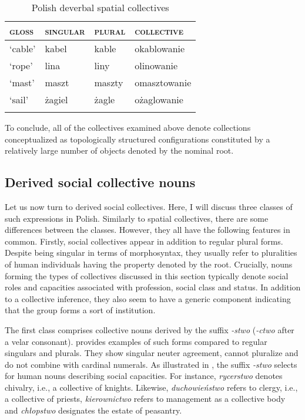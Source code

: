 \documentclass[output=paper]{langscibook}
\begin{document}
\begin{table}[h!]
\caption{Polish deverbal spatial collectives} 
\label{wan:tab:okablowanie}
 \begin{tabular}{llll} 
  \lsptoprule
           \textsc{gloss} & \textsc{singular} & \textsc{plural} & \textsc{collective} \\ 
  \midrule
  `cable'  &   kabel &    kable  &    okablowanie \\
  `rope'  &   lina &   liny &    olinowanie \\
  `mast'  &   maszt &   maszty &    omasztowanie \\
  `sail'  &   żagiel &   żagle &    ożaglowanie \\
  \lspbottomrule
 \end{tabular}
\end{table}

To conclude, all of the collectives examined above denote collections conceptualized as topologically structured configurations constituted by a relatively large number of objects denoted by the nominal root.  

\subsection{Derived social collective nouns}\label{wan:sec:derived-social-collective-nouns}

Let us now turn to derived social collectives. Here, I will discuss three classes of such expressions in Polish. Similarly to spatial collectives, there are some differences between the classes. However, they all have the following features in common. Firstly, social collectives appear in addition to regular plural forms. Despite being singular in terms of morphosyntax, they usually refer to pluralities of human individuals having the property denoted by the root. Crucially, nouns forming the types of collectives discussed in this section typically denote social roles and capacities associated with profession, social class and status. In addition to a collective inference, they also seem to have a generic component indicating that the group forms a sort of institution.  

The first class comprises collective nouns derived by the suffix \textit{-stwo} (\textit{-ctwo} after a velar consonant).  provides examples of such forms compared to regular singulars and plurals. They show singular neuter agreement, cannot pluralize and do not combine with cardinal numerals. As illustrated in , the suffix \textit{-stwo} selects for human nouns describing social capacities. For instance, \textit{rycerstwo} denotes chivalry, i.e., a collective of knights. Likewise, \textit{duchowieństwo} refers to clergy, i.e., a collective of priests, \textit{kierownictwo} refers to management as a collective body and \textit{chłopstwo} designates the estate of peasantry.
\end{document}
